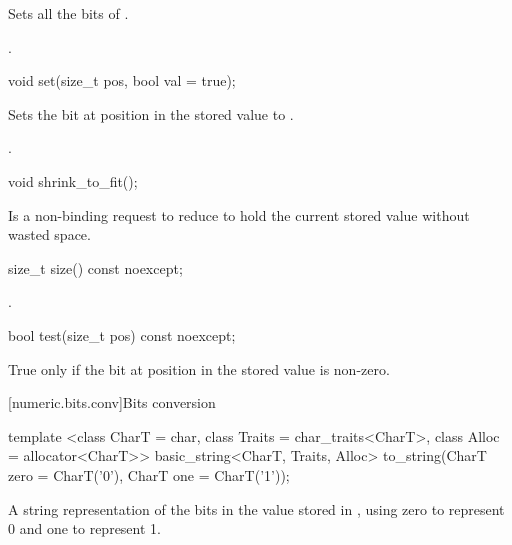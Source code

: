 \begin{itemdescr}
\effects Sets all the bits of .

.	
\end{itemdescr}

\begin{itemdecl}
void set(size_t pos, bool val = true);	
\end{itemdecl}

\begin{itemdescr}
\effects Sets the bit at position  in the stored value to .

\returns {}.
\end{itemdescr}

\begin{itemdecl}
void shrink_to_fit();	
\end{itemdecl}

\begin{itemdescr}
\effects Is a non-binding request to reduce  to hold the current stored value without wasted space.
\end{itemdescr}

\begin{itemdecl}
size_t size() const noexcept;	
\end{itemdecl}

\begin{itemdescr}
\returns {}.
\end{itemdescr}

\begin{itemdecl}
bool test(size_t pos) const noexcept;	
\end{itemdecl}

\begin{itemdescr}
\returns True only if the bit at position  in the stored value is non-zero.
\end{itemdescr}

[numeric.bits.conv]{Bits conversion}

\begin{itemdecl}
template <class CharT = char, class Traits = char_traits<CharT>, class Alloc = allocator<CharT>>
  basic_string<CharT, Traits, Alloc> to_string(CharT zero = CharT('0'),
                                               CharT one = CharT('1'));	
\end{itemdecl}

\begin{itemdescr}
\returns A string representation of the bits in the value stored in , using zero to represent 0 and one to represent 1.	
\end{itemdescr}


